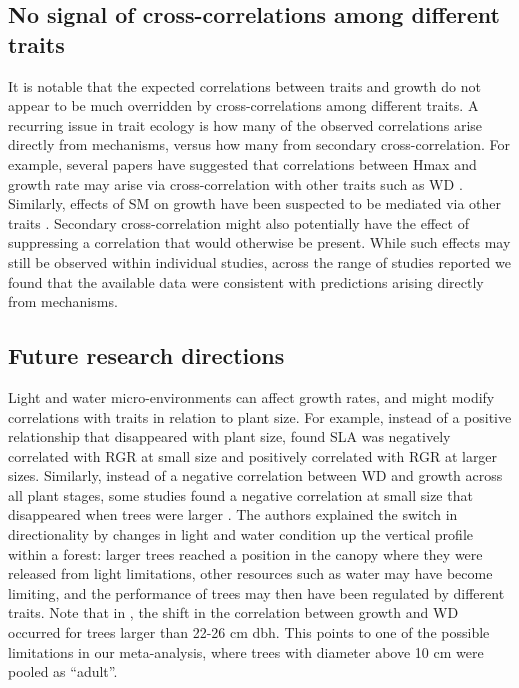 \documentclass[a4paper,11pt]{article}
\begin{document}
\subsection*{No signal of cross-correlations among different traits}

It is notable that the expected correlations between traits and growth do not appear to be much overridden by cross-correlations among different traits. A recurring issue in trait ecology is how many of the observed correlations arise directly from mechanisms, versus how many from secondary cross-correlation. For example, several papers have suggested that correlations between Hmax and growth rate may arise via cross-correlation with other traits such as WD \citep{Thomas:1996do, Poorter:2006vb, Wright:2010tp}. Similarly, effects of SM on growth have been suspected to be mediated via other traits \citep{Shipley:1990js,Westoby:2002ft,Poorter:2006vb}. Secondary cross-correlation might also potentially have the effect of suppressing a correlation that would otherwise be present. While such effects may still be observed within individual studies, across the range of studies reported we found that the available data were consistent with predictions arising directly from mechanisms.

\subsection*{Future research directions}

Light and water micro-environments can affect growth rates, and might modify correlations with traits in relation to plant size. For example, instead of a positive relationship that disappeared with plant size, \citet{Iida:2014ep} found SLA was negatively correlated with RGR at small size and positively correlated with RGR at larger sizes. Similarly, instead of a negative correlation between WD and growth across all plant stages, some studies found a negative correlation at small size that disappeared when trees were larger \citep{Iida:2014ep,Iida:2014hq}. The authors explained the switch in directionality by changes in light and water condition up the vertical profile within a forest: larger trees reached a position in the canopy where they were released from light limitations, other resources such as water may have become limiting, and the performance of trees may then have been regulated by different traits. Note that in \citet{Iida:2014hq}, the shift in the correlation between growth and WD occurred for trees larger than 22-26 cm dbh. This points to one of the possible limitations in our meta-analysis, where trees with diameter above 10 cm were pooled as ``adult''.
\end{document}
